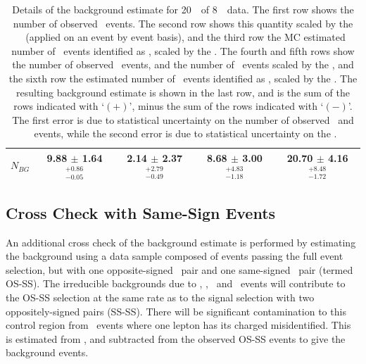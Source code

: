 \begin{table}[htbp]
\begin{tabular}{lcccc}
\hline
$N_{BG}$                            &  9.88 $\pm$ 1.64 $^{+0.86}_{-0.05}$ &  2.14 $\pm$ 2.37 $^{+2.79}_{-0.49}$ &  8.68 $\pm$ 3.00 $^{+4.83}_{-1.18}$ &  20.70 $\pm$ 4.16 $^{+8.48}_{-1.72}$ \\
\hline\hline
\end{tabular}
\renewcommand\arraystretch{1.}
\caption{\small Details of the background estimate for 20~\ifb\ of 8~\tev\ data. The first row
shows the number of observed \NLLLJ\ events. The second row shows this quantity
scaled by the \ffactor\ (applied on an event by event basis), and the third row
the MC estimated number of \ZZ\ events identified as \LLJJ, scaled by the
\fakefactor. The fourth and
fifth rows
show the number of observed \NLLJJ\ events, and the number of \NLLJJ\ events
scaled by the \ffactor, and the sixth row the estimated number of \ZZ\ events
identified as \LLLJ, scaled by the \ffactor. The resulting background estimate
is shown in the last row, and is the sum of the rows indicated with `$(+)$',
minus the sum of the rows indicated with `$(-)$'. The first error is due to
statistical uncertainty on the number of observed \LLLJ\ and \LLJJ\ events,
while the
second error is due to statistical uncertainty on the \ffactor.}
\label{bg-est-nominal-eight}
\end{table}

\subsection{Cross Check with Same-Sign Events}

An additional cross check of the background estimate is performed by estimating
the background using a data sample composed of events passing the full event
selection, but with one opposite-signed
\dilep\ pair and one same-signed \dilep\ pair (termed OS-SS). The irreducible backgrounds due
to \Zjets, \ttbar, \WW\ and \WZ\ events will contribute to the OS-SS selection at
the same rate as to the signal selection with two oppositely-signed pairs
(SS-SS). There will be significant contamination to this control region from \ZZ\ events where
one lepton has its charged misidentified. This is estimated from \mc, and
subtracted from the observed OS-SS events to give the background events. 

